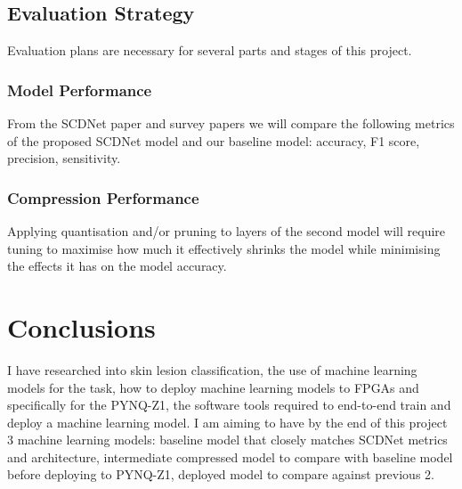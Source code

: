 \documentclass[12pt,nonacm,acmlarge,titlepage,screen]{acmart}
\begin{document}
	\subsection{Evaluation Strategy}
	Evaluation plans are necessary for several parts and stages of this project.

		\subsubsection{Model Performance}
		From the SCDNet paper \cite{scdnet_2022} and survey papers \cite{survey_2023,survey_general_2023} we will compare the following metrics of the proposed SCDNet model and our baseline model: accuracy, F1 score, precision, sensitivity.

		\subsubsection{Compression Performance}
		Applying quantisation and/or pruning to layers of the second model will require tuning to maximise how much it effectively shrinks the model while minimising the effects it has on the model accuracy.

	

\section{Conclusions}
I have researched into skin lesion classification, the use of machine learning models for the task, how to deploy machine learning models to FPGAs and specifically for the PYNQ-Z1, the software tools required to end-to-end train and deploy a machine learning model. I am aiming to have by the end of this project 3 machine learning models: baseline model that closely matches SCDNet metrics and architecture, intermediate compressed model to compare with baseline model before deploying to PYNQ-Z1, deployed model to compare against previous 2.
\end{document}
